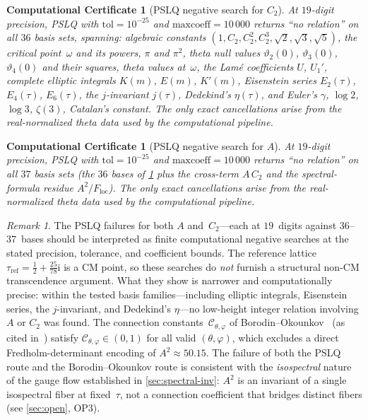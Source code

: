 \documentclass[11pt,a4paper]{article}
\theoremstyle{plain}
\newtheorem{computationalcertificate}[theorem]{Computational Certificate}
\theoremstyle{definition}
\theoremstyle{remark}
\newtheorem{remark}[theorem]{Remark}
\newcommand{\vt}[1]{\vartheta_{#1}}     %
\newcommand{\ii}{\mathrm{i}}
\begin{document}
\begin{computationalcertificate}[PSLQ negative search for $C_2$]
\label{prop:pslq-C2-neg}
At $19$-digit precision, PSLQ with $\mathrm{tol} = 10^{-25}$
and $\mathrm{maxcoeff} = 10\,000$ returns \textup{``no relation''}
on all $36$ basis sets, spanning:
algebraic constants $(1, C_2, C_2^2, C_2^3, \sqrt{2},
\sqrt{3}, \sqrt{5})$,
the critical point~$\omega$ and its powers,
$\pi$ and $\pi^2$,
theta null values $\vt{2}(0)$, $\vt{3}(0)$, $\vt{4}(0)$
and their squares,
theta values at~$\omega$,
the Lam\'e coefficients $U$, $U_1'$,
complete elliptic integrals $K(m)$, $E(m)$, $K'(m)$,
Eisenstein series $E_2(\tau)$, $E_4(\tau)$, $E_6(\tau)$,
the $j$-invariant $j(\tau)$,
Dedekind's $\eta(\tau)$,
and Euler's $\gamma$, $\log 2$, $\log 3$,
$\zeta(3)$, Catalan's constant.
The only exact cancellations arise from the real-normalized theta data
used by the computational pipeline.
\end{computationalcertificate}

\begin{computationalcertificate}[PSLQ negative search for $A$]
\label{prop:pslq-neg}
At $19$-digit precision, PSLQ with $\mathrm{tol} = 10^{-25}$
and $\mathrm{maxcoeff} = 10\,000$ returns \textup{``no relation''}
on all $37$ basis sets (the $36$ bases of
\cref{prop:pslq-C2-neg} plus the cross-term $A \,C_2$
and the spectral-formula residue $A^2 / F_{\mathrm{loc}}$).
The only exact cancellations arise from the real-normalized theta data
used by the computational pipeline.
\end{computationalcertificate}

\begin{remark}\label{rem:pslq-structural}
  The PSLQ failures for both $A$ and~$C_2$---each at $19$~digits
  against $36$--$37$~bases should be interpreted as finite
  computational negative searches at the stated precision,
  tolerance, and coefficient bounds.  The reference lattice
  $\tau_{\mathrm{ref}} = \tfrac12 + \tfrac{25}{78}\ii$
  is a CM point, so these
  searches do \emph{not} furnish a structural non-CM transcendence
  argument.  What they show is narrower and computationally precise:
  within the tested basis families---including elliptic integrals,
  Eisenstein series, the $j$-invariant, and Dedekind's $\eta$---no
  low-height integer relation involving $A$ or $C_2$ was found.
  The connection constants~$\mathcal{C}_{\theta,\varphi}$
  of Borodin--Okounkov~\cite{BO00} (as cited in~\cite[Eq.~D47]{DC26}) satisfy
  $\mathcal{C}_{\theta,\varphi} \in (0,1)$ for all valid
  $(\theta,\varphi)$, which excludes a direct Fredholm-determinant
  encoding of $A^2 \approx 50.15$.
  The failure of both the PSLQ route and the
  Borodin--Okounkov route is consistent with the
  \emph{isospectral} nature of the gauge flow established
  in \cref{sec:spectral-inv}: $A^2$ is an invariant of a
  single isospectral fiber at fixed~$\tau$, not a connection
  coefficient that bridges distinct fibers
  (see \cref{sec:open}, OP3).
\end{remark}
\end{document}
